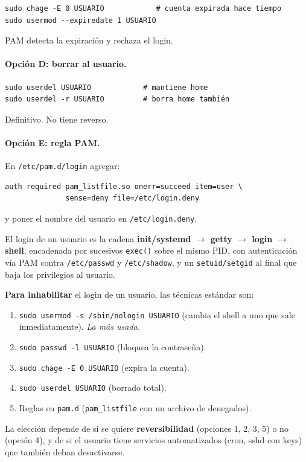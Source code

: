\documentclass[11pt,a4paper]{article}
\begin{document}
\begin{lstlisting}[style=shellstyle]
sudo chage -E 0 USUARIO            # cuenta expirada hace tiempo
sudo usermod --expiredate 1 USUARIO
\end{lstlisting}

PAM detecta la expiración y rechaza el login.

\paragraph{Opción D: borrar al usuario.}

\begin{lstlisting}[style=shellstyle]
sudo userdel USUARIO            # mantiene home
sudo userdel -r USUARIO         # borra home también
\end{lstlisting}

Definitivo. No tiene reverso.

\paragraph{Opción E: regla PAM.}
En \texttt{/etc/pam.d/login} agregar:

\begin{lstlisting}[style=textstyle]
auth required pam_listfile.so onerr=succeed item=user \
              sense=deny file=/etc/login.deny
\end{lstlisting}

\noindent y poner el nombre del usuario en \texttt{/etc/login.deny}.

\begin{respuesta}
El login de un usuario es la cadena
\textbf{init/systemd $\to$ getty $\to$ login $\to$ shell},
encadenada por sucesivos \texttt{exec()} sobre el mismo PID, con
autenticación vía PAM contra \texttt{/etc/passwd} y
\texttt{/etc/shadow}, y un \texttt{setuid/setgid} al final que baja
los privilegios al usuario.

\textbf{Para inhabilitar} el login de un usuario, las técnicas
estándar son:

\begin{enumerate}[leftmargin=*,nosep]
    \item \texttt{sudo usermod -s /sbin/nologin USUARIO} (cambia el
        shell a uno que sale inmediatamente). \emph{La más usada.}
    \item \texttt{sudo passwd -l USUARIO} (bloquea la contraseña).
    \item \texttt{sudo chage -E 0 USUARIO} (expira la cuenta).
    \item \texttt{sudo userdel USUARIO} (borrado total).
    \item Reglas en \texttt{pam.d} (\texttt{pam\_listfile} con un
        archivo de denegados).
\end{enumerate}

La elección depende de si se quiere \textbf{reversibilidad}
(opciones 1, 2, 3, 5) o no (opción 4), y de si el usuario tiene
servicios automatizados (cron, sshd con keys) que también deban
desactivarse.
\end{respuesta}
\end{document}
